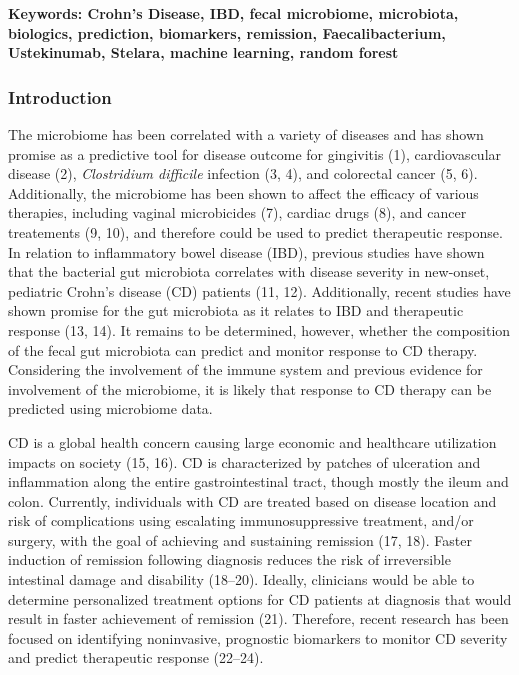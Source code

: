 \documentclass[11pt,]{article}
\begin{document}
\textbf{Keywords: Crohn's Disease, IBD, fecal microbiome, microbiota,
biologics, prediction, biomarkers, remission, Faecalibacterium,
Ustekinumab, Stelara, machine learning, random forest}

\newpage

\subsubsection{Introduction}\label{introduction}

The microbiome has been correlated with a variety of diseases and has
shown promise as a predictive tool for disease outcome for gingivitis
(1), cardiovascular disease (2), \emph{Clostridium difficile} infection
(3, 4), and colorectal cancer (5, 6). Additionally, the microbiome has
been shown to affect the efficacy of various therapies, including
vaginal microbicides (7), cardiac drugs (8), and cancer treatements (9,
10), and therefore could be used to predict therapeutic response. In
relation to inflammatory bowel disease (IBD), previous studies have
shown that the bacterial gut microbiota correlates with disease severity
in new-onset, pediatric Crohn's disease (CD) patients (11, 12).
Additionally, recent studies have shown promise for the gut microbiota
as it relates to IBD and therapeutic response (13, 14). It remains to be
determined, however, whether the composition of the fecal gut microbiota
can predict and monitor response to CD therapy. Considering the
involvement of the immune system and previous evidence for involvement
of the microbiome, it is likely that response to CD therapy can be
predicted using microbiome data.

CD is a global health concern causing large economic and healthcare
utilization impacts on society (15, 16). CD is characterized by patches
of ulceration and inflammation along the entire gastrointestinal tract,
though mostly the ileum and colon. Currently, individuals with CD are
treated based on disease location and risk of complications using
escalating immunosuppressive treatment, and/or surgery, with the goal of
achieving and sustaining remission (17, 18). Faster induction of
remission following diagnosis reduces the risk of irreversible
intestinal damage and disability (18--20). Ideally, clinicians would be
able to determine personalized treatment options for CD patients at
diagnosis that would result in faster achievement of remission (21).
Therefore, recent research has been focused on identifying noninvasive,
prognostic biomarkers to monitor CD severity and predict therapeutic
response (22--24).
\end{document}
